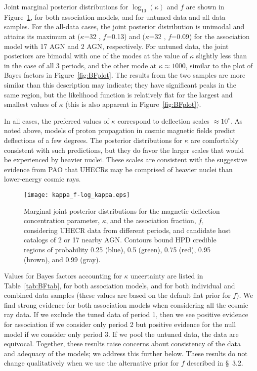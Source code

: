 Joint marginal posterior distributions for $\log_{10}(\kappa)$ and $f$ are
shown in Figure~\ref{fig:jointkappaf}, for both association models, and for
untuned data and all data samples.  For the all-data cases, the joint
posterior distribution is unimodal and attains its maximum at ($\kappa$=32 ,
$f$=0.13) and ($\kappa$=32 , $f$=0.09) for the association model with 17
AGN and 2 AGN, respectively.  For untuned data, the joint posteriors are
bimodal with one of the modes at the value of $\kappa$ slightly less than in
the case of all 3 periods, and the other mode at $\kappa\approx 1000$,
similar to the plot of Bayes factors in Figure~\ref{fig:BFplot}.  The
results from the two samples are more similar than this description may
indicate; they have significant peaks in the same region, but the likelihood
function is relatively flat for the largest and smallest values of $\kappa$
(this is also apparent in Figure~\ref{fig:BFplot}).

In all cases, the preferred values of $\kappa$ correspond to deflection
scales $\approx 10^\circ$.  As noted above, models of proton propagation in
cosmic magnetic fields predict deflections of a few degrees.
The posterior distributions for $\kappa$ are comfortably consistent with
such predictions, but they do favor the larger scales that would be
experienced by heavier nuclei.  These scales are consistent with the
suggestive evidence from PAO that UHECRs may be comprised of heavier nuclei
than lower-energy cosmic rays.

\begin{figure}
\centerline{\texttt{[image: kappa\_f-log\_kappa.eps]}}
\caption{Marginal joint posterior distributions for the magnetic deflection
concentration parameter, $\kappa$, and the association fraction, $f$,
considering UHECR data from different periods, and candidate host catalogs of 2
or 17 nearby AGN.  Contours bound HPD credible regions of probability
0.25 (blue), 0.5 (green), 0.75 (red), 0.95 (brown), and 0.99 (gray).}
\label{fig:jointkappaf}
\end{figure}

Values for Bayes factors accounting for $\kappa$ uncertainty are listed in
Table~\ref{tab:BFtab}, for both association models, and for both individual
and combined data samples (these values are based on the default flat
prior for $f$).  We find strong evidence for both association models when
considering all the cosmic ray data.  If we exclude the tuned data of period
1, then we see positive evidence for association if we consider only period
2 but positive evidence for the null model if we consider only period 3.  If
we pool the untuned data, the data are equivocal.  Together, these results
raise concerns about consistency of the data and adequacy of the models; we
address this further below.  These results do not change qualitatively when
we use the alternative prior for $f$ described in \S~3.2.

